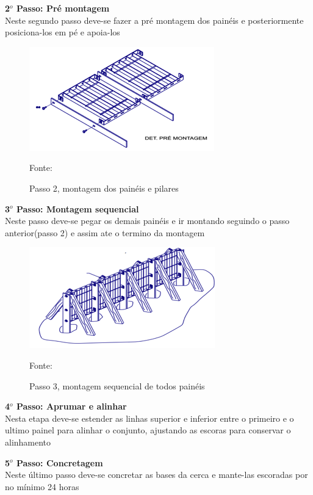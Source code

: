 \textbf{2$^{o}$ Passo: Pr\'e montagem} \\ Neste segundo passo deve-se fazer a  pr\'e montagem dos pain\'eis e posteriormente posiciona-los em p\'e e apoia-los

\begin{figure}[h!]
	\centering
	\label{MontagemPaineisPilares}
		\includegraphics[keepaspectratio=true,scale=0.8]{figuras/MontagemPaineisPilares.png}
	\caption{Passo 2, montagem dos pain\'eis e pilares}
	\small{Fonte: \cite{CatalogoCercamento}}
\end{figure}

\textbf{3$^{o}$ Passo: Montagem sequencial} \\ Neste passo deve-se pegar os demais pain\'eis e ir montando seguindo o passo anterior(passo 2) e assim ate o termino da montagem

\begin{figure}[h!]
	\centering
	\label{MontagemSequencialPaineis}
		\includegraphics[keepaspectratio=true,scale=0.8]{figuras/MontagemSequencialPaineis.png}
	\caption{Passo 3, montagem sequencial de todos pain\'eis}
	\small{Fonte:  \cite{CatalogoCercamento}}
\end{figure}

\textbf{4$^{o}$ Passo: Aprumar e alinhar} \\ Nesta etapa deve-se estender as linhas superior e inferior entre o primeiro e o ultimo painel para alinhar o conjunto, ajustando as escoras para conservar o alinhamento

\textbf{5$^{o}$ Passo: Concretagem} \\ Neste \'ultimo passo deve-se concretar as bases da cerca e mante-las escoradas por no m\'inimo 24 horas

